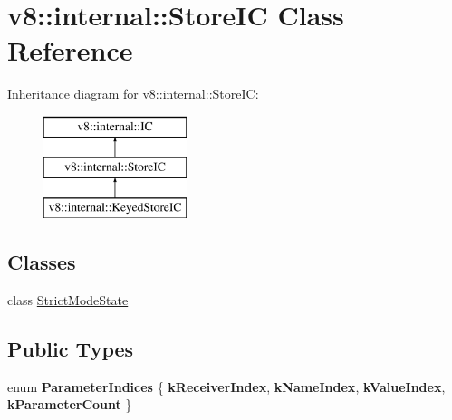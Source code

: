 \hypertarget{classv8_1_1internal_1_1_store_i_c}{}\section{v8\+:\+:internal\+:\+:Store\+I\+C Class Reference}
\label{classv8_1_1internal_1_1_store_i_c}
Inheritance diagram for v8\+:\+:internal\+:\+:Store\+I\+C\+:\begin{figure}[H]
\begin{center}
\leavevmode
\includegraphics[height=3.000000cm]{classv8_1_1internal_1_1_store_i_c}
\end{center}
\end{figure}
\subsection*{Classes}
\begin{DoxyCompactItemize}
\item 
class \hyperlink{classv8_1_1internal_1_1_store_i_c_1_1_strict_mode_state}{Strict\+Mode\+State}
\end{DoxyCompactItemize}
\subsection*{Public Types}
\begin{DoxyCompactItemize}
\item 
\hypertarget{classv8_1_1internal_1_1_store_i_c_ac428bbf4fbbb815f39d7a13c8aaa6c2d}{}enum {\bfseries Parameter\+Indices} \{ {\bfseries k\+Receiver\+Index}, 
{\bfseries k\+Name\+Index}, 
{\bfseries k\+Value\+Index}, 
{\bfseries k\+Parameter\+Count}
 \}\label{classv8_1_1internal_1_1_store_i_c_ac428bbf4fbbb815f39d7a13c8aaa6c2d}

\end{DoxyCompactItemize}
